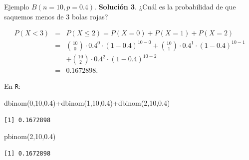\documentclass[
  ignorenonframetext,
  aspectratio=169]{beamer}
\newenvironment{Shaded}{\begin{snugshade}}{\end{snugshade}}
\newcommand{\DecValTok}[1]{\textcolor[rgb]{0.68,0.00,0.00}{#1}}
\newcommand{\FloatTok}[1]{\textcolor[rgb]{0.68,0.00,0.00}{#1}}
\newcommand{\FunctionTok}[1]{\textcolor[rgb]{0.28,0.35,0.67}{#1}}
\newcommand{\NormalTok}[1]{\textcolor[rgb]{0.00,0.23,0.31}{#1}}
\newcommand{\SpecialCharTok}[1]{\textcolor[rgb]{0.37,0.37,0.37}{#1}}
\begin{document}
\begin{frame}[fragile]{Ejemplo \(B(n=10,p=0.4).\)}
\protect\hypertarget{ejemplo-bn10p0.4.-5}{}
\textbf{Solución 3}. ¿Cuál es la probabilidad de que saquemos menos de
\(3\) bolas rojas?

\begin{eqnarray*}
P(X< 3)&=& P(X\leq 2)=  P(X=0)+P(X=1)+P(X=2)\\
&=& 
{10\choose 0}\cdot 0.4^0\cdot (1-0.4)^{10-0}+ {10\choose 1}\cdot 0.4^1\cdot (1-0.4)^{10-1}\\
&&+
{10\choose 2}\cdot 0.4^2\cdot (1-0.4)^{10-2}\\
&=&0.1672898.
\end{eqnarray*}

En \texttt{R}:

\begin{Shaded}
\begin{Highlighting}[]
\FunctionTok{dbinom}\NormalTok{(}\DecValTok{0}\NormalTok{,}\DecValTok{10}\NormalTok{,}\FloatTok{0.4}\NormalTok{)}\SpecialCharTok{+}\FunctionTok{dbinom}\NormalTok{(}\DecValTok{1}\NormalTok{,}\DecValTok{10}\NormalTok{,}\FloatTok{0.4}\NormalTok{)}\SpecialCharTok{+}\FunctionTok{dbinom}\NormalTok{(}\DecValTok{2}\NormalTok{,}\DecValTok{10}\NormalTok{,}\FloatTok{0.4}\NormalTok{)}
\end{Highlighting}
\end{Shaded}

\begin{verbatim}
[1] 0.1672898
\end{verbatim}

\begin{Shaded}
\begin{Highlighting}[]
\FunctionTok{pbinom}\NormalTok{(}\DecValTok{2}\NormalTok{,}\DecValTok{10}\NormalTok{,}\FloatTok{0.4}\NormalTok{)}
\end{Highlighting}
\end{Shaded}

\begin{verbatim}
[1] 0.1672898
\end{verbatim}
\end{frame}
\end{document}
